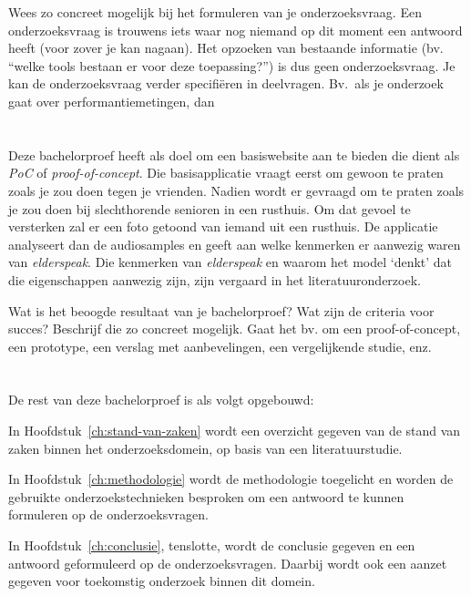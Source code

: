 \color{blue}
Wees zo concreet mogelijk bij het formuleren van je onderzoeksvraag. Een onderzoeksvraag is trouwens iets waar nog niemand op dit moment een antwoord heeft (voor zover je kan nagaan). Het opzoeken van bestaande informatie (bv. ``welke tools bestaan er voor deze toepassing?'') is dus geen onderzoeksvraag. Je kan de onderzoeksvraag verder specifiëren in deelvragen. Bv.~als je onderzoek gaat over performantiemetingen, dan
\color{black}

\section{}
\label{sec:onderzoeksdoelstelling}

Deze bachelorproef heeft als doel om een basiswebsite aan te bieden die dient als \textit{PoC} of \textit{proof-of-concept}. Die basisapplicatie vraagt eerst om gewoon te praten zoals je zou doen tegen je vrienden. Nadien wordt er gevraagd om te praten zoals je zou doen bij slechthorende senioren in een rusthuis. Om dat gevoel te versterken zal er een foto getoond van iemand uit een rusthuis. De applicatie analyseert dan de audiosamples en geeft aan welke kenmerken er aanwezig waren van \textit{elderspeak}. Die kenmerken van \textit{elderspeak} en waarom het model `denkt' dat die eigenschappen aanwezig zijn, zijn vergaard in het literatuuronderzoek.

\color{blue}
Wat is het beoogde resultaat van je bachelorproef? Wat zijn de criteria voor succes? Beschrijf die zo concreet mogelijk. Gaat het bv. om een proof-of-concept, een prototype, een verslag met aanbevelingen, een vergelijkende studie, enz.
\color{black}


\section{}
\label{sec:opzet-bachelorproef}


De rest van deze bachelorproef is als volgt opgebouwd:

In Hoofdstuk~\ref{ch:stand-van-zaken} wordt een overzicht gegeven van de stand van zaken binnen het onderzoeksdomein, op basis van een literatuurstudie.

In Hoofdstuk~\ref{ch:methodologie} wordt de methodologie toegelicht en worden de gebruikte onderzoekstechnieken besproken om een antwoord te kunnen formuleren op de onderzoeksvragen.


In Hoofdstuk~\ref{ch:conclusie}, tenslotte, wordt de conclusie gegeven en een antwoord geformuleerd op de onderzoeksvragen. Daarbij wordt ook een aanzet gegeven voor toekomstig onderzoek binnen dit domein.